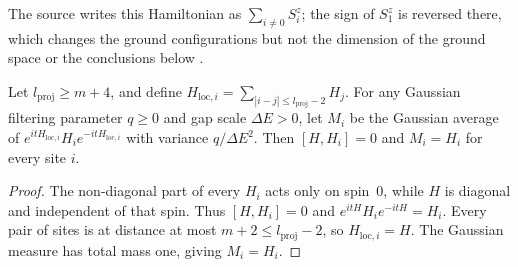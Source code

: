 The source writes this Hamiltonian as $\sum_{i\neq0}S^z_i$; the sign of
$S^z_1$ is reversed there, which changes the ground configurations but not
the dimension of the ground space or the conclusions below
\cite{gap:hastings05_low_energy_example}.

\begin{lemma}
    \label{thm:hastings_low_energy_example_truncated}
    \leanok
    Let $l_{\mathrm{proj}}\ge m+4$, and define
    $H_{\mathrm{loc},i}=\sum_{|i-j|\le l_{\mathrm{proj}}-2}H_j$.
    For any Gaussian filtering parameter $q\ge0$ and gap scale $\Delta E>0$,
    let $M_i$ be the Gaussian average of
    $e^{itH_{\mathrm{loc},i}}H_ie^{-itH_{\mathrm{loc},i}}$ with variance
    $q/\Delta E^2$. Then $[H,H_i]=0$ and $M_i=H_i$ for every site $i$.
\end{lemma}
\begin{proof}\leanok
    The non-diagonal part of every $H_i$ acts only on spin~$0$, while $H$
    is diagonal and independent of that spin. Thus $[H,H_i]=0$ and
    $e^{itH}H_ie^{-itH}=H_i$. Every pair of sites is at distance at most
    $m+2\le l_{\mathrm{proj}}-2$, so $H_{\mathrm{loc},i}=H$.
    The Gaussian measure has total mass one, giving $M_i=H_i$.
\end{proof}

